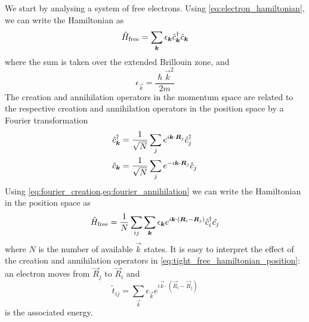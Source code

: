 We start by analysing a system of free electrons. Using \cref{eq:electron_hamiltonian}, we can write the Hamiltonian as
\begin{equation}
    \hat{H}_\text{free} = \sum_{\mathbf{\boldsymbol{k}}} \epsilon_{\mathbf{\boldsymbol{k}}} \hat{c}^\dagger_{\mathbf{\boldsymbol{k}}}\hat{c}_{\mathbf{\boldsymbol{k}}}
\end{equation}
where the sum is taken over the extended Brillouin zone, and
\begin{equation} \label{eq:tight_free_disperion}
    \epsilon_{\vec{k}} = \frac{\hslash\vec{k}^2}{2m}
\end{equation}
The creation and annihilation operators in the momentum space are related to the respective creation and annihilation operators in the position space by a Fourier transformation
\begin{align} \label{eq:fourier_creation}
    \hat{c}^\dagger_{\mathbf{\boldsymbol{k}}} & = \frac{1}{\sqrt{N}} \sum_j e^{i\mathbf{\boldsymbol{k}}\cdot\mathbf{\boldsymbol{R}}_j} \hat{c}^\dagger_j \\ \label{eq:fourier_annihilation}
    \hat{c}_{\mathbf{\boldsymbol{k}}}  & = \frac{1}{\sqrt{N}} \sum_j e^{-i\mathbf{\boldsymbol{k}}\cdot\mathbf{\boldsymbol{R}}_j} \hat{c}_j
\end{align}
Using \cref{eq:fourier_creation,eq:fourier_annihilation} we can write the Hamiltonian in the position space as
\begin{equation} \label{eq:tight_free_hamiltonian_position}
    \hat{H}_\text{free} = \frac{1}{N} \sum_{ij} \sum_{\mathbf{\boldsymbol{k}}} \epsilon_{\mathbf{\boldsymbol{k}}} e^{i\mathbf{\boldsymbol{k}}\cdot(\mathbf{\boldsymbol{R}}_i - \mathbf{\boldsymbol{R}}_j)} \hat{c}^\dagger_i\hat{c_j}
\end{equation}
where $N$ is the number of available $\vec{k}$ states. It is easy to interpret the effect of the creation and annihilation operators in \cref{eq:tight_free_hamiltonian_position}: an electron moves from $\vec{R}_j$ to $\vec{R}_i$ and
\begin{equation}
    \tilde{t}_{ij} = \sum_\vec{k} \epsilon_{\vec{k}} e^{i\vec{k}\cdot(\vec{R}_i - \vec{R}_j)}
\end{equation}
is the associated energy.

